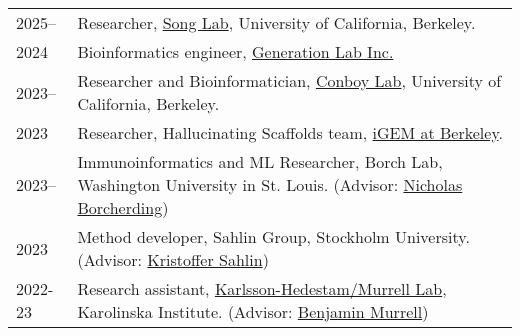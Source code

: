 
\begin{longtable}[l]{@{}p{} p{}}

    2025-- & Researcher, \href{https://people.eecs.berkeley.edu/~yss/}{Song Lab}, University of California, Berkeley. \\

    2024 & Bioinformatics engineer, \href{https://www.generationlab.com/}{Generation Lab Inc.} \\

    2023-- & Researcher and Bioinformatician, \href{https://conboylab.berkeley.edu/}{Conboy Lab}, University of California, Berkeley. \\

    2023 & Researcher, Hallucinating Scaffolds team, \href{https://igem.studentorg.berkeley.edu/teams/hallucinating-scaffolds/}{iGEM at Berkeley}. \\

    2023-- & Immunoinformatics and ML Researcher, Borch Lab, Washington University in St. Louis. (Advisor: \href{https://www.borch.dev/}{Nicholas Borcherding}) \\

    2023 & Method developer, Sahlin Group, Stockholm University. (Advisor: \href{https://www.scilifelab.se/researchers/kristoffer-sahlin/}{Kristoffer Sahlin}) \\

    2022-23 & Research assistant, \href{https://ki.se/en/people/benjamin-murrell}{Karlsson-Hedestam/Murrell Lab}, Karolinska Institute. (Advisor: \href{https://ki.se/en/people/benjamin-murrell}{Benjamin Murrell}) \\

\end{longtable}
